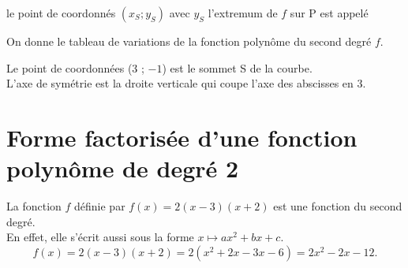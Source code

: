 	\begin{bdefi}
		le point de coordonnés $\left(x_S ; y_S\right)$ avec $y_S$ l'extremum de $f$ sur $\mathrm{P}$ est appelé \pointille[5cm]
	\end{bdefi}
	
	\begin{bexemple}
		On donne le tableau de variations de la fonction polynôme du second degré $f$.
		\begin{minipage}[c]{0.48\linewidth}
			
			Le point de coordonnées (3 ; $-1$) est le sommet S de la courbe.\\
			L'axe de symétrie est la droite verticale qui coupe l'axe des abscisses en 3.\\
		\end{minipage} \hfill
		\begin{minipage}[c]{0.48\linewidth}
		\end{minipage}
		
	\end{bexemple}
	
	\section{Forme factorisée d'une fonction polynôme de degré 2}
	
	\begin{bexemple}
		La fonction $f$ définie par $f(x)=2(x-3)(x+2)$ est une fonction du second degré.\\
		En effet, elle s'écrit aussi sous la forme $x \mapsto a x^{2}+b x+c$.
		$$
		f(x)=2(x-3)(x+2)=2\left(x^{2}+2 x-3 x-6\right)=2 x^{2}-2 x-12 .
		$$
	\end{bexemple}
	

